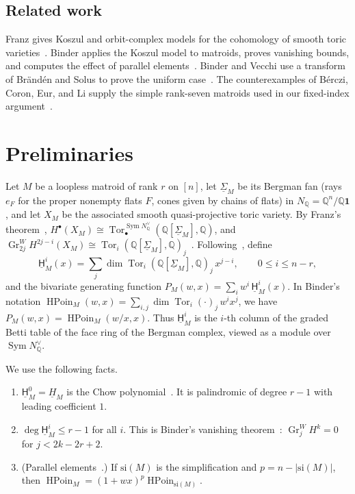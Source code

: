 \documentclass[a4paper,envcountsame,runningheads]{llncs}
\newcommand{\uH}{\underline{\mathsf H}}
\newcommand{\Q}{\mathbb Q}
\newcommand{\si}{\mathrm{si}}
\begin{document}
\subsection{Related work}
Franz gives Koszul and orbit-complex models for the cohomology of smooth toric varieties~\cite{Franz,FranzOrbit}. Binder applies the Koszul model to matroids, proves vanishing bounds, and computes the effect of parallel elements~\cite[Proposition~3.6 and Theorem~6.6]{Binder}. Binder and Vecchi use a transform of Br\"and\'en and Solus to prove the uniform case~\cite{BS,BV}. The counterexamples of B\'erczi, Coron, Eur, and Li supply the simple rank-seven matroids used in our fixed-index argument~\cite[Theorem~C]{BCEL}.

\section{Preliminaries}

Let $M$ be a loopless matroid of rank $r$ on $[n]$, let $\underline\Sigma_M$ be its Bergman fan (rays $e_F$ for the proper nonempty flats $F$, cones given by chains of flats) in $N_\Q=\Q^n/\Q\mathbf 1$, and let $X_M$ be the associated smooth quasi-projective toric variety. By Franz's theorem~\cite{Franz},
$H^\bullet(X_M)\cong \operatorname{Tor}^{\operatorname{Sym}N^\vee_\Q}_\bullet(\Q[\underline\Sigma_M],\Q)$, and $\operatorname{Gr}^W_{2j}H^{2j-i}(X_M)\cong \operatorname{Tor}_i(\Q[\underline\Sigma_M],\Q)_j$~\cite{Binder,BV}. Following~\cite{BV}, define
\[
\uH^i_M(x)=\sum_j \dim \operatorname{Tor}_i(\Q[\underline\Sigma_M],\Q)_j\, x^{j-i},\qquad 0\le i\le n-r,
\]
and the bivariate generating function $P_M(w,x)=\sum_i w^i\,\uH^i_M(x)$. In Binder's notation $\operatorname{HPoin}_M(w,x)=\sum_{i,j}\dim\operatorname{Tor}_i(\cdot)_j\,w^ix^j$, we have $P_M(w,x)=\operatorname{HPoin}_M(w/x,x)$. Thus $\uH^i_M$ is the $i$-th column of the graded Betti table of the face ring of the Bergman complex, viewed as a module over $\operatorname{Sym}N^\vee_\Q$.

We use the following facts.
\begin{enumerate}
\item $\uH^0_M=\underline H_M$ is the Chow polynomial~\cite{BV}. It is palindromic of degree $r-1$ with leading coefficient $1$.
\item $\deg \uH^i_M\le r-1$ for all $i$. This is Binder's vanishing theorem~\cite[Thm.~6.6]{Binder}: $\operatorname{Gr}^W_{j}H^k=0$ for $j<2k-2r+2$.
\item (Parallel elements~\cite[Prop.~3.6]{Binder}.) If $\si(M)$ is the simplification and $p=n-|\si(M)|$, then $\operatorname{HPoin}_M=(1+wx)^p\operatorname{HPoin}_{\si(M)}$.
\end{enumerate}
\end{document}
